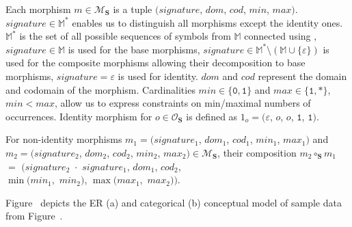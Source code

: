 
Each morphism $m \in \mathcal{M}_\mathbf{S}$ is a tuple $(signature$, $dom$, $cod$, $min$, $max)$. $signature \in \mathbb{M}^{*}$ enables us to distinguish all morphisms except the identity ones. $\mathbb{M}^{*}$ is the set of all possible sequences of symbols from $\mathbb{M}$ connected using \uv{$\cdot$}, $signature \in \mathbb{M}$ is used for the base morphisms, $signature \in \mathbb{M}^{*} \setminus (\mathbb{M} \cup \{\varepsilon\})$ is used for the composite morphisms allowing their decomposition to base morphisms, $signature = \varepsilon$ is used for identity. %
$dom$ and $cod$ represent the domain and codomain of the morphism. Cardinalities $min \in \{\mathtt{0}, \mathtt{1}\}$ and $max \in \{\mathtt{1}, \mathtt{*}\}$, $min < max$, allow us to express constraints on min/maximal numbers of occurrences.
Identity morphism for $o \in \mathcal{O}_\mathbf{S}$ is defined as $1_o = (\varepsilon$, $o$, $o$, $\mathtt{1}$, $\mathtt{1})$. 

For non-identity morphisms $m_1 = (signature_1$, $dom_1$, $cod_1$, $min_1$, $max_1)$ and $m_2 = (signature_2$, $dom_2$, $cod_2$, $min_2$, $max_2) \in \mathcal{M}_\mathbf{S}$, their composition $m_2 \circ_\mathbf{S} m_1$ $=$ $(signature_2$ $\!\cdot\!$  $signature_1$, $dom_1$, $cod_2$, \\$\min(min_1,$ $min_2)$, $\max(max_1,$ $max_2))$.



\begin{example}
Figure~ depicts the ER (a) and categorical (b) conceptual model of sample data from Figure~.
\end{example}


